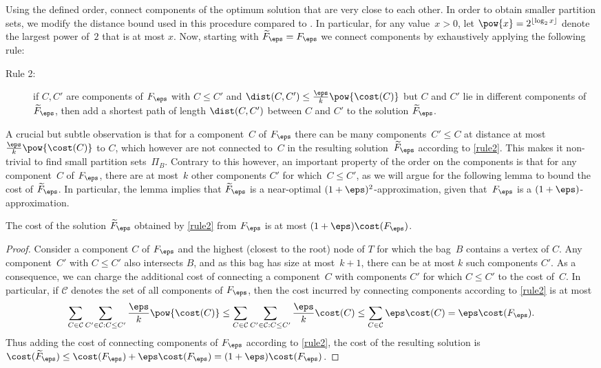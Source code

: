 Using the defined order, \citet{bateni2011approximation} connect components of the optimum solution that are very close to each other.
In order to obtain smaller partition sets, we modify the distance bound used in this procedure compared to \citet{bateni2011approximation}. 
In particular, for any value~$x>0$, let $\pow{x}=2^{\lfloor\log_{2}x\rfloor}$ 
denote the largest power of~$2$ that is at most $x$.
%
Now, starting with $\widetilde{F}_\eps=F_\eps$ we connect components by exhaustively applying the following rule:
\begin{description}
\item[Rule 2:] if $C,C'$ are components of $F_\eps$ with $C\leq C'$ and $\dist(C,C')\leq\frac{\eps}{k}\pow{\cost(C)}$ but $C$ and $C'$ lie in different components of $\widetilde{F}_\eps$, then add a shortest path of length $\dist(C,C')$ between $C$ and $C'$ to the solution $\widetilde{F}_\eps$.
\end{description}

A crucial but subtle observation is that for a component~$C$ of $F_\eps$ there can be many components~$C'\leq C$ at distance at most $\frac{\eps}{k}\pow{\cost(C)}$ to $C$, 
which however are not connected to~$C$ in the resulting solution~$\widetilde{F}_\eps$ according to \autoref{rule2}. 
This makes it non-trivial to find small partition sets~$\Pi_B$.
Contrary to this however, an important property of the order on the components is that for any component~$C$ of $F_\eps$, 
there are at most~$k$ other components $C'$ for which~$C\leq C'$, as we will argue for the following lemma to bound the cost of $\widetilde{F}_\eps$. 
In particular, the lemma implies that $\widetilde{F}_\eps$ is a near-optimal $(1+\eps)^2$-approximation, given that~$F_\eps$ is a $(1+\eps)$-approximation.

\begin{lemma}\label{lem:near-opt-2} %
The cost of the solution $\widetilde{F}_\eps$ obtained by \autoref{rule2} from $F_\eps$ is at most $(1+\eps)\cost(F_\eps)$.
\end{lemma}

%
\begin{proof}%
Consider a component $C$ of $F_\eps$ and the highest (closest to the root) node of $T$ for which the bag~$B$ contains a vertex of $C$.
Any component~$C'$ with $C\leq C'$ also intersects $B$, and as this bag
has size at most~$k+1$, there can be at most $k$ such components $C'$.
As a consequence, we can charge the additional cost of connecting a component~$C$ with components $C'$ for which $C\leq C'$
to the cost of~$C$. In particular, if $\mathcal{C}$ denotes the set of all components of $F_\eps$, then
the cost incurred by connecting components according to \autoref{rule2} is at most
\[
\sum_{C\in\mathcal{C}}\sum_{C'\in\mathcal{C}: C\leq C'}\frac{\eps}{k}\pow{\cost(C)}\leq
\sum_{C\in\mathcal{C}}\sum_{C'\in\mathcal{C}: C\leq C'}\frac{\eps}{k}\cost(C)\leq
\sum_{C\in\mathcal{C}}\eps\cost(C)=\eps\cost(F_\eps).
\]
Thus adding the cost of connecting components of $F_\eps$ according to \autoref{rule2}, the cost of the resulting solution is $\cost(\widetilde{F}_\eps)\leq\cost(F_\eps)+\eps\cost(F_\eps)=(1+\eps)\cost(F_\eps)$.
\end{proof}    
%


